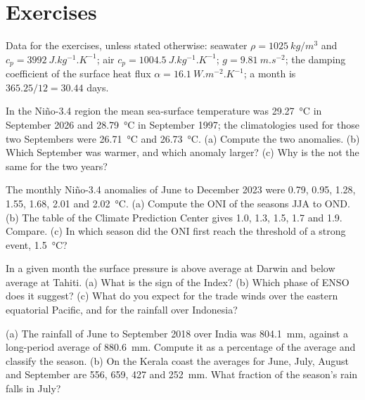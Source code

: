 \section*{Exercises}\label{sec:b2:climate-variability:exercises}

Data for the exercises, unless stated otherwise: seawater $\rho = \qty{1025}{kg/m^3}$ and $c_p =
\qty{3992}{J.kg^{-1}.K^{-1}}$; air $c_p = \qty{1004.5}{J.kg^{-1}.K^{-1}}$; $g =
\qty{9.81}{m.s^{-2}}$; the damping coefficient of the surface heat flux $\alpha =
\qty{16.1}{W.m^{-2}.K^{-1}}$; a month is $365.25/12 = 30.44$ days.

\begin{exercise}[$\star$]\label{exo:b2:climate-variability:1}
In the Niño-3.4 region the mean sea-surface temperature was \qty{29.27}{\celsius} in September
2026 and \qty{28.79}{\celsius} in September 1997; the climatologies used for those two Septembers
were \qty{26.71}{\celsius} and \qty{26.73}{\celsius}. (a) Compute the two anomalies. (b) Which
September was warmer, and which anomaly larger? (c) Why is the  not the same for the
two years?
\end{exercise}

\begin{exercise}[$\star$]\label{exo:b2:climate-variability:2}
The monthly Niño-3.4 anomalies of June to December 2023 were 0.79, 0.95, 1.28, 1.55, 1.68, 2.01
and \qty{2.02}{\celsius}. (a) Compute the ONI of the seasons JJA to OND. (b) The table of the
Climate Prediction Center gives 1.0, 1.3, 1.5, 1.7 and 1.9. Compare. (c) In which season did the
ONI first reach the threshold of a strong event, \qty{1.5}{\celsius}?
\end{exercise}

\begin{exercise}[$\star$]\label{exo:b2:climate-variability:3}
In a given month the surface pressure is above average at Darwin and below average at Tahiti.
(a) What is the sign of the  Index? (b) Which phase of ENSO does it suggest?
(c) What do you expect for the trade winds over the eastern equatorial Pacific, and for the
rainfall over Indonesia?
\end{exercise}

\begin{exercise}[$\star$]\label{exo:b2:climate-variability:4}
(a) The rainfall of June to September 2018 over India was \qty{804.1}{mm}, against a
long-period average of \qty{880.6}{mm}. Compute it as a percentage of the average and classify
the season. (b) On the Kerala coast the averages for June, July, August and September are 556,
659, 427 and \qty{252}{mm}. What fraction of the season's rain falls in July?
\end{exercise}

